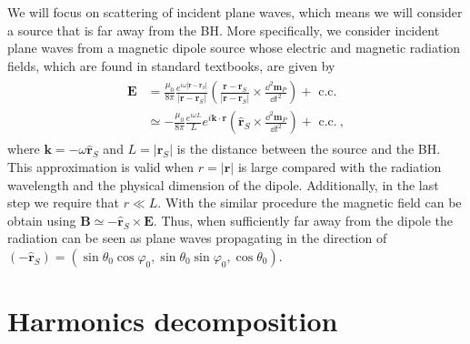 We will focus on scattering of incident plane waves, which means we will consider a source that is far away from the BH.
More specifically, we consider incident plane waves from a magnetic dipole source whose electric and magnetic radiation fields, which are found in standard textbooks, are given by
\begin{align}
    \begin{split}
        \mathbf{E} &= \frac{\mu_0}{8\pi}
        \frac{e^{i\omega|\mathbf{r}-\mathbf{r}_S|}}{|\mathbf{r}-\mathbf{r}_S|} \left(
        \frac{\mathbf{r}-\mathbf{r}_S}{|\mathbf{r}-\mathbf{r}_S|} \times
        \frac{\dd^2 \mathbf{m}_P}{\dd t^2} \right) + \text{ c.c.} \\
        & \simeq  - \frac{\mu_0}{8\pi} \frac{e^{i \omega L}}{L}
        e^{i \mathbf{k} \cdot \mathbf{r}} \left( \mathbf{\hat{r}}_S \times
        \frac{\dd^2 \mathbf{m}_P}{\dd t^2} \right) + \text{ c.c.} ~,
    \end{split}
\end{align}
where $\mathbf{k}= -\omega \mathbf{\hat{r}}_S$ and $L=|\mathbf{r}_S|$ is the distance between the source and the BH.
This approximation is valid when $r=|\mathbf{r}|$ is large compared with the radiation wavelength and the physical dimension of the dipole.
Additionally, in the last step we require that $r \ll L$.
With the similar procedure the magnetic field can be obtain using $\mathbf{B}\simeq - \mathbf{\hat{r}}_S \times \mathbf{E}$.
Thus, when sufficiently far away from the dipole the radiation can be seen as plane waves propagating in the direction of $(- \mathbf{\hat{r}}_S) = (\sin\theta_0 \cos\varphi_0, \sin\theta_0 \sin\varphi_0, \cos\theta_0)$.


\section{Harmonics decomposition}

